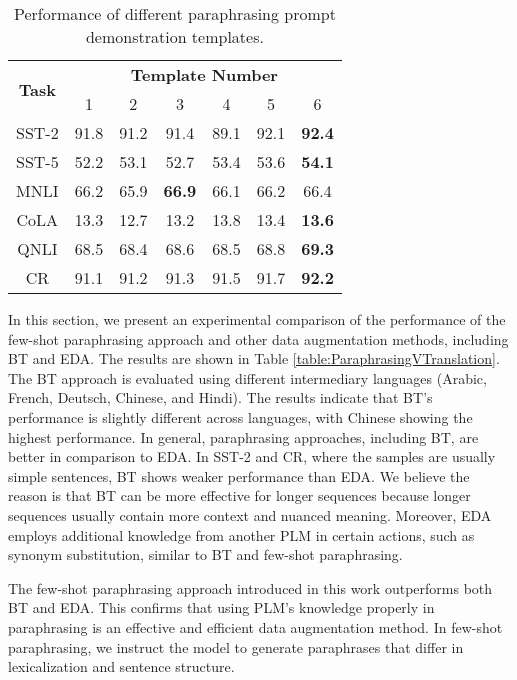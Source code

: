 \documentclass[11pt]{article}
\begin{document}
\begin{table}[]
    \small
    \centering
    \begin{tabular}{c|cccccc}
        \toprule
        \multirow{2}{*}{\textbf{Task}} & \multicolumn{6}{c}{\textbf{Template Number}}                       \\
                              & 1    & 2    & 3             & 4    & 5    & 6             \\ \hline
        SST-2                 & 91.8 & 91.2 & 91.4          & 89.1 & 92.1 & \textbf{92.4} \\
        SST-5                 & 52.2 & 53.1 & 52.7          & 53.4 & 53.6 & \textbf{54.1} \\
        MNLI                  & 66.2 & 65.9 & \textbf{66.9} & 66.1 & 66.2 & 66.4          \\
        CoLA                  & 13.3 & 12.7 & 13.2          & 13.8 & 13.4 & \textbf{13.6} \\
        QNLI                  & 68.5 & 68.4 & 68.6          & 68.5 & 68.8 & \textbf{69.3} \\
        CR                    & 91.1 & 91.2 & 91.3          & 91.5 & 91.7 & \textbf{92.2} \\ \bottomrule
    \end{tabular}
    \caption{Performance of different paraphrasing prompt demonstration templates.
    \label{table:differentPromptTemplates}}
\end{table}

In this section, we present an experimental comparison of the performance of the few-shot paraphrasing approach and other data augmentation methods, including BT and EDA. The results are shown in Table \ref{table:ParaphrasingVTranslation}. The BT approach is evaluated using different intermediary languages (Arabic, French, Deutsch, Chinese, and Hindi). The results indicate that BT's performance is slightly different across languages, with Chinese showing the highest performance. In general, paraphrasing approaches, including BT, are better in comparison to EDA. In SST-2 and CR, where the samples are usually simple sentences, BT shows weaker performance than EDA. We believe the reason is that BT can be more effective for longer sequences because longer sequences usually contain more context and nuanced meaning. Moreover, EDA employs additional knowledge from another PLM in certain actions, such as synonym substitution, similar to BT and few-shot paraphrasing. 

The few-shot paraphrasing approach introduced in this work outperforms both BT and EDA. This confirms that using PLM's knowledge properly in paraphrasing is an effective and efficient data augmentation method. In few-shot paraphrasing, we instruct the model to generate paraphrases that differ in lexicalization and sentence structure. 
\end{document}
